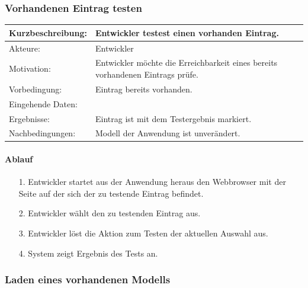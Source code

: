 \subsubsection{Vorhandenen Eintrag testen}
\label{sec:test_entry}

\begin{tabular}[h]{|p{4cm}|p{}|}
\hline 
\rule[-1ex]{0pt}{2.5ex}Kurzbeschreibung: & 
Entwickler testest einen vorhanden Eintrag. \\  
\hline 
\rule[-1ex]{0pt}{2.5ex}Akteure: & 
Entwickler \\ 
\hline 
\rule[-1ex]{0pt}{2.5ex}Motivation: & 
Entwickler möchte die Erreichbarkeit eines bereits vorhandenen Eintrags prüfe. \\ 
\hline 
\rule[-1ex]{0pt}{2.5ex}Vorbedingung: & 
Eintrag bereits vorhanden. \\ 
\hline 
\rule[-1ex]{0pt}{2.5ex}Eingehende Daten: & \\ 
\hline 
\rule[-1ex]{0pt}{2.5ex}Ergebnisse: & Eintrag ist mit dem Testergebnis markiert. \\ 
\hline 
\rule[-1ex]{0pt}{2.5ex}Nachbedingungen: & Modell der Anwendung ist unverändert.  \\ 
\hline 
\end{tabular} 

\paragraph{Ablauf}

\begin{itemize}[itemsep=0pt]
\item[1.] Entwickler startet aus der Anwendung heraus den Webbrowser mit der Seite auf der sich der zu testende Eintrag befindet. 
\item[2.] Entwickler wählt den zu testenden Eintrag aus.
\item[3.] Entwickler löst die Aktion zum Testen der aktuellen Auswahl aus. 
\item[4.] System zeigt Ergebnis des Tests an.
\end{itemize}


\subsubsection{Laden eines vorhandenen Modells}
\label{sec:load}

